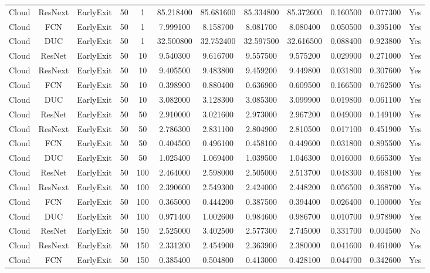 \begin{tabular}{|c||c||c||c||c||c||c||c||c||c||c||c|}
Cloud & ResNext & EarlyExit & 50 & 1 & 85.218400 & 85.681600 & 85.334800 & 85.372600 & 0.160500 & 0.077300 & Yes \\
Cloud & FCN & EarlyExit & 50 & 1 & 7.999100 & 8.158700 & 8.081700 & 8.080400 & 0.050500 & 0.395100 & Yes \\
Cloud & DUC & EarlyExit & 50 & 1 & 32.500800 & 32.752400 & 32.597500 & 32.616500 & 0.088400 & 0.923800 & Yes \\
Cloud & ResNet & EarlyExit & 50 & 10 & 9.540300 & 9.616700 & 9.557500 & 9.575200 & 0.029900 & 0.271000 & Yes \\
Cloud & ResNext & EarlyExit & 50 & 10 & 9.405500 & 9.483800 & 9.459200 & 9.449800 & 0.031800 & 0.307600 & Yes \\
Cloud & FCN & EarlyExit & 50 & 10 & 0.398900 & 0.880400 & 0.636900 & 0.609500 & 0.166500 & 0.762500 & Yes \\
Cloud & DUC & EarlyExit & 50 & 10 & 3.082000 & 3.128300 & 3.085300 & 3.099900 & 0.019800 & 0.061100 & Yes \\
Cloud & ResNet & EarlyExit & 50 & 50 & 2.910000 & 3.021600 & 2.973000 & 2.967200 & 0.049000 & 0.149100 & Yes \\
Cloud & ResNext & EarlyExit & 50 & 50 & 2.786300 & 2.831100 & 2.804900 & 2.810500 & 0.017100 & 0.451900 & Yes \\
Cloud & FCN & EarlyExit & 50 & 50 & 0.404500 & 0.496100 & 0.458100 & 0.449600 & 0.031800 & 0.895500 & Yes \\
Cloud & DUC & EarlyExit & 50 & 50 & 1.025400 & 1.069400 & 1.039500 & 1.046300 & 0.016000 & 0.665300 & Yes \\
Cloud & ResNet & EarlyExit & 50 & 100 & 2.464000 & 2.598000 & 2.505000 & 2.513700 & 0.048300 & 0.468100 & Yes \\
Cloud & ResNext & EarlyExit & 50 & 100 & 2.390600 & 2.549300 & 2.424000 & 2.448200 & 0.056500 & 0.368700 & Yes \\
Cloud & FCN & EarlyExit & 50 & 100 & 0.365000 & 0.444200 & 0.387500 & 0.394400 & 0.026400 & 0.100000 & Yes \\
Cloud & DUC & EarlyExit & 50 & 100 & 0.971400 & 1.002600 & 0.984600 & 0.986700 & 0.010700 & 0.978900 & Yes \\
Cloud & ResNet & EarlyExit & 50 & 150 & 2.525000 & 3.402500 & 2.577300 & 2.745000 & 0.331700 & 0.004500 & No \\
Cloud & ResNext & EarlyExit & 50 & 150 & 2.331200 & 2.454900 & 2.363900 & 2.380000 & 0.041600 & 0.461000 & Yes \\
Cloud & FCN & EarlyExit & 50 & 150 & 0.385400 & 0.504800 & 0.413000 & 0.428100 & 0.044700 & 0.342600 & Yes \\

\end{tabular}
